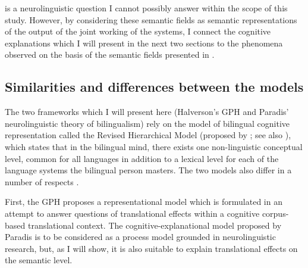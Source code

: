 is a neurolinguistic question I cannot possibly answer within the scope of this study. However, by considering these semantic fields as semantic representations of the output of the joint working of the systems, I connect the cognitive explanations which I will present in the next two sections to the phenomena observed on the basis of the semantic fields presented in .

\subsection{Similarities and differences between the models}
\label{sec:5.1.3}  
The two frameworks which I will present here (Halverson’s GPH and Paradis’ neurolinguistic theory of bilingualism) rely on the model of bilingual cognitive representation called the Revised Hierarchical Model (proposed by \citealt{kroll_category_1994}; see also \citealt{brysbaert_is_2010,kroll_revised_2010}), which states that in the bilingual mind, there exists one non-linguistic conceptual level, common for all languages in addition to a lexical level for each of the language systems the bilingual person masters. The two models also differ in a number of respects \citep{cook_effects_2003}.

First, the GPH proposes a representational model which is formulated in an attempt to answer questions of translational effects within a cognitive corpus-based translational context. The cognitive-explanational model proposed by Paradis is to be considered as a process model grounded in neurolinguistic research, but, as I will show, it is also suitable to explain translational effects on the semantic level.

